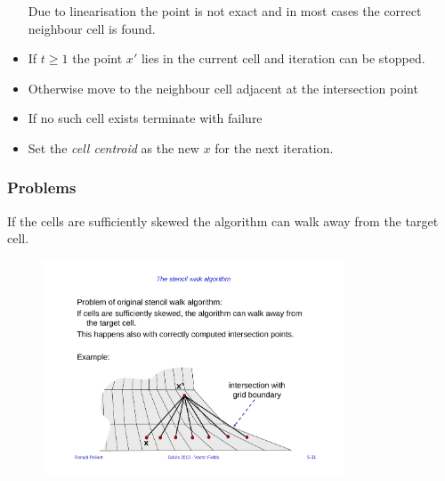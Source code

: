 \begin{itemize}
\begin{itemize}
        \end{itemize}
        Due to linearisation the point is not exact and in most cases the correct neighbour cell is found.
    \item If $t\geq 1$ the point $x'$ lies in the current cell and iteration can be stopped.
    \item Otherwise move to the neighbour cell adjacent at the intersection point
    \item If no such cell exists terminate with failure
    \item Set the \emph{cell centroid} as the new $x$ for the next iteration.
\end{itemize}


\subsubsection{Problems}
If the cells are sufficiently skewed the algorithm can walk away from the target cell.
\begin{figure}[H]
    \centering
    \includegraphics[width=0.8\textwidth]{img/05_stencil_walk_problems}
\end{figure}

